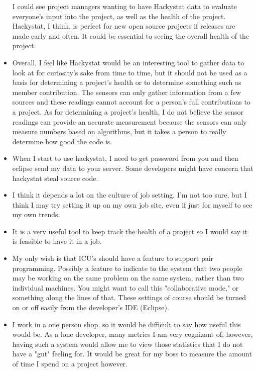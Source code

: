 \begin{itemize}
I could see project managers wanting to have Hackystat data to evaluate everyone's input into the project, as well as the health of the project. Hackystat, I think, is perfect for new open source projects if releases are made early and often. It could be essential to seeing the overall health of the project.
\item Overall, I feel like Hackystat would be an interesting tool to gather data to look at for curiosity's sake from time to time, but it should not be used as a basis for determining a project's health or to determine something such as member contribution. The sensors can only gather information from a few sources and these readings cannot account for a person's full contributions to a project. As for determining a project's health, I do not believe the sensor readings can provide an accurate measurement because the sensors can only measure numbers based on algorithms, but it takes a person to really determine how good the code is.
\item When I start to use hackystat, I need to get password from you and then eclipse send my data to your server. Some developers might have concern that hackystat steal source code.
\item I think it depends a lot on the culture of job setting.  I'm not too sure, but I think I may try setting it up on my own job site, even if just for myself to see my own trends.
\item It is a very useful tool to keep track the health of a project so I would say it is feasible to have it in a job.
\item My only wish is that ICU's should have a feature to support pair programming. Possibly a feature to indicate to the system that two people may be working on the same problem on the same system, rather than two individual machines. You might want to call this "collaborative mode," or something along the lines of that. These settings of course should be turned on or off easily from the developer's IDE (Eclipse).  
\item I work in a one person shop, so it would be difficult to say how useful this would be.  As a lone developer, many metrics I am very cognizant of, however, having such a system would allow me to view those statistics that I do not have a "gut" feeling for.  It would be great for my boss to measure the amount of time I spend on a project however.
\end{itemize}
